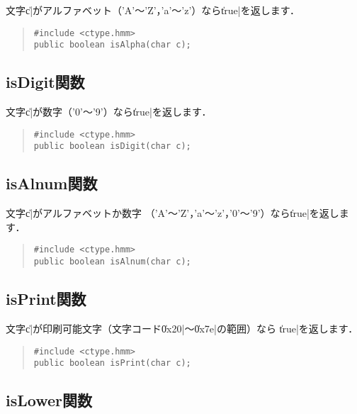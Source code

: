 文字\|c|がアルファベット（'A'〜'Z'，'a'〜'z'）なら\|true|を返します．

\begin{quote}
\begin{verbatim}
#include <ctype.hmm>
public boolean isAlpha(char c);
\end{verbatim}
\end{quote}

\subsection{isDigit関数}

文字\|c|が数字（'0'〜'9'）なら\|true|を返します．

\begin{quote}
\begin{verbatim}
#include <ctype.hmm>
public boolean isDigit(char c);
\end{verbatim}
\end{quote}

\subsection{isAlnum関数}

文字\|c|がアルファベットか数字
（'A'〜'Z'，'a'〜'z'，'0'〜'9'）なら\|true|を返します．

\begin{quote}
\begin{verbatim}
#include <ctype.hmm>
public boolean isAlnum(char c);
\end{verbatim}
\end{quote}

\subsection{isPrint関数}

文字\|c|が印刷可能文字（文字コード\|0x20|〜\|0x7e|の範囲）なら
\|true|を返します．

\begin{quote}
\begin{verbatim}
#include <ctype.hmm>
public boolean isPrint(char c);
\end{verbatim}
\end{quote}

\subsection{isLower関数}

